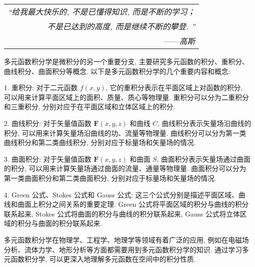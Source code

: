 \begin{flushright}
    \begin{tabular}{r|}
        \textit{“给我最大快乐的, 不是已懂得知识, 而是不断的学习；}\\
        \textit{不是已达到的高度, 而是继续不断的攀登. ”}\\
        ——\textit{高斯}
    \end{tabular}
\end{flushright}

多元函数积分学是微积分的另一个重要分支, 主要研究多元函数的积分、重积分、曲线积分、曲面积分等概念. 以下是多元函数积分学的几个重要内容和概念: 

1. 重积分: 对于二元函数 $f(x, y)$, 它的重积分表示在平面区域上对函数的积分, 可以用来计算平面区域上的面积、质量、质心等物理量. 重积分可以分为二重积分和三重积分, 分别对应于在平面区域和立体区域上的积分. 

2. 曲线积分: 对于矢量值函数 $\mathbf{F}(x, y, z)$ 和曲线 $C$, 曲线积分表示矢量场沿曲线的积分, 可以用来计算矢量场沿曲线的功、流量等物理量. 曲线积分可以分为第一类曲线积分和第二类曲线积分, 分别对应于标量场和矢量场的情况. 

3. 曲面积分: 对于矢量值函数 $\mathbf{F}(x, y, z)$ 和曲面 $S$, 曲面积分表示矢量场通过曲面的积分, 可以用来计算矢量场通过曲面的流量、通量等物理量. 曲面积分可以分为第一类曲面积分和第二类曲面积分, 分别对应于标量场和矢量场的情况. 

4. Green 公式、Stokes 公式和 Gauss 公式: 这三个公式分别是描述平面区域、曲线和曲面上积分之间关系的重要定理. Green 公式将平面区域的积分与曲线的积分联系起来, Stokes 公式将曲面的积分与曲线的积分联系起来, Gauss 公式将立体区域的积分与曲面的积分联系起来. 

多元函数积分学在物理学、工程学、地理学等领域有着广泛的应用, 例如在电磁场分析、流体力学、地形分析等方面都需要用到多元函数积分学的知识. 通过学习多元函数积分学, 可以更深入地理解多元函数在空间中的积分性质. 